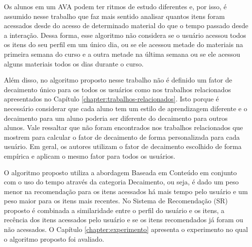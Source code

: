 Os alunos em um AVA podem ter ritmos de estudo diferentes e, por isso, é assumido nesse trabalho que faz
mais sentido analisar quantos itens foram acessados desde do acesso de determinado material do que o tempo passado desde
a interação. Dessa forma, esse algoritmo não considera se o usuário acessou todos os itens do seu perfil em um
único dia, ou se ele acessou metade do materiais na primeira semana do curso e a outra metade na última semana ou se ele
acessou alguns materiais todos os dias durante o curso.

Além disso, no algoritmo proposto nesse trabalho não é definido um fator de decaimento único para os todos os usuários como nos trabalhos
relacionados apresentados no Capítulo \ref{chapter:trabalhos-relacionados}. Isto porque é necessário considerar
que cada aluno tem um estilo de aprendizagem diferente e o decaimento para um aluno poderia ser diferente do decaimento
para outros alunos. Vale ressaltar que não foram encontrados nos trabalhos relacionados que mostrem para calcular o fator
de decaimento de forma personalizada para cada usuário. Em geral, os autores utilizam o fator de decaimento escolhido de
forma empírica e aplicam o mesmo fator para todos os usuários.

O algoritmo proposto utiliza a abordagem Baseada em Conteúdo em
conjunto com o uso do tempo através da categoria Decaimento, ou seja, é dado um peso menor na recomendação para os
itens acessados há mais tempo pelo usuário e um peso maior para os itens mais recentes. No Sistema de Recomendação (SR)
proposto é combinada a similaridade entre o perfil do usuário e os itens, a recência dos itens acessados pelo usuário e
se os itens recomendados já foram ou não acessados. O Capítulo \ref{chapter:experimento} apresenta o experimento no qual
o algoritmo proposto foi avaliado.


